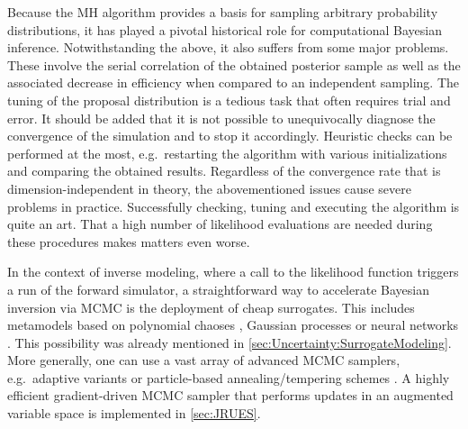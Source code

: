 \par %
Because the MH algorithm provides a basis for sampling arbitrary probability distributions, it has played a pivotal historical role for computational Bayesian inference.
Notwithstanding the above, it also suffers from some major problems.
These involve the serial correlation of the obtained posterior sample as well as the associated decrease in efficiency when compared to an independent sampling.
The tuning of the proposal distribution is a tedious task that often requires trial and error.
It should be added that it is not possible to unequivocally diagnose the convergence of the simulation and to stop it accordingly.
Heuristic checks can be performed at the most, e.g.\ restarting the algorithm with various initializations and comparing the obtained results.
Regardless of the convergence rate that is dimension-independent in theory, the abovementioned issues cause severe problems in practice.
Successfully checking, tuning and executing the algorithm is quite an art.
That a high number of likelihood evaluations are needed during these procedures makes matters even worse.
\par %
In the context of inverse modeling, where a call to the likelihood function triggers a run of the forward simulator,
a straightforward way to accelerate Bayesian inversion via MCMC is the deployment of cheap surrogates.
This includes metamodels based on polynomial chaoses \cite{PCE:Tagade2014,PCE:Sraj2016}, Gaussian processes \cite{MCMC:Angelikopoulos2015,Kriging:Wan2016}
or neural networks \cite{ML:Balaji2010,ML:Hauser2012}.
This possibility was already mentioned in \cref{sec:Uncertainty:SurrogateModeling}.
More generally, one can use a vast array of advanced MCMC samplers,
e.g.\ adaptive variants \cite{MCMC:Haario2001,MCMC:Andrieu2008} or particle-based annealing/tempering schemes \cite{MCMC:Ching2007,MCMC:Betz2016}.
A highly efficient gradient-driven MCMC sampler that performs updates in an augmented variable space is implemented in \cref{sec:JRUES}.

